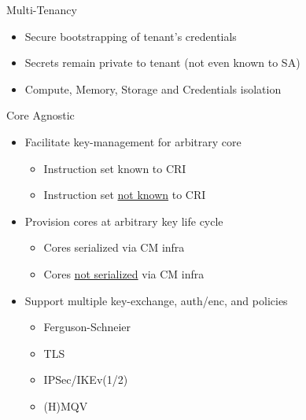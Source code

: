 \documentclass[handout,xcolor=svgnames]{beamer}
\newcommand{\hicolor}{darkorange}
\newcommand{\imp}[1]{\begin{center}\Large{\color{\hicolor}{#1}}\end{center}}
\begin{document}
\begin{frame}
\begin{columns}
\begin{column}{0.3\textwidth}
    \end{column}
    \end{columns}
\end{frame}


\begin{frame}
  {Multi-Tenancy}
  \imp{Multiple Tenants share the same secure hardware element}
    \begin{itemize}
      \item Secure bootstrapping of tenant's credentials
      \item Secrets remain private to tenant (not even known to SA)
      \item Compute, Memory, Storage and Credentials isolation
    \end{itemize}
\end{frame}


\begin{frame}
  {Core Agnostic}
  \imp{Single infrastructure should support heterogeneous set of cores}
    \begin{itemize}
      \item Facilitate key-management for arbitrary core
      \begin{itemize}
          \item Instruction set known to CRI
          \item Instruction set \underline{not known} to CRI
      \end{itemize}
      \item Provision cores at arbitrary key life cycle
      \begin{itemize}
          \item Cores serialized via CM infra
          \item Cores \underline{not serialized} via CM infra
      \end{itemize}
      \item Support multiple key-exchange, auth/enc, and policies
      \begin{itemize}
          \item Ferguson-Schneier
          \item TLS
          \item IPSec/IKEv(1/2)
          \item (H)MQV
      \end{itemize}
  \end{itemize}
\end{frame}
\end{document}
